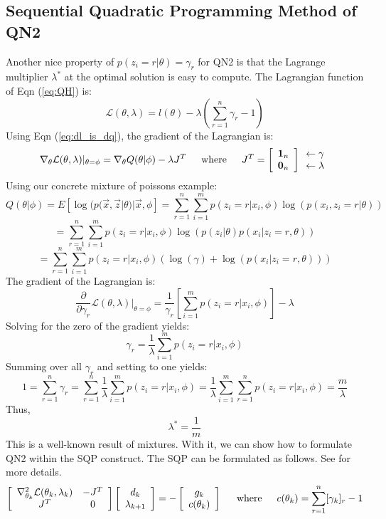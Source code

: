 \documentclass[letter,12pt]{article}
\begin{document}
\subsection{Sequential Quadratic Programming Method of QN2}

Another nice property of $p(z_i=r|\theta)=\gamma_r$ for QN2 is that the Lagrange multiplier $\lambda^*$ at the optimal solution is easy to compute.  The Lagrangian function of Eqn (\ref{eq:QH}) is:
\[
\mathcal{L}(\theta,\lambda) = l(\theta) - \lambda(\sum_{r=1}^{n}\gamma_r - 1)
\]
Using Eqn (\ref{eq:dl_is_dq}), the gradient of the Lagrangian is:
\[
\nabla_{\theta}\mathcal{L}(\theta,\lambda)|_{\theta=\phi}
= \nabla_{\theta}Q(\theta|\phi) - \lambda J^T
\indent
\text{where}
\indent
J^T =
\left[
\begin{array}{c}
\boldsymbol{1}_n
\\
\boldsymbol{0}_n
\end{array}
\right]
\begin{array}{c}
\leftarrow\gamma
\\
\leftarrow\lambda
\end{array}
\]
Using our concrete mixture of poissons example:
\[
Q(\theta|\phi) = E[\log(p(\vec{x},\vec{z}|\theta)|\vec{x},\phi]
=
\sum_{r=1}^{n}\sum_{i=1}^{m}p(z_i=r|x_i,\phi)\log(p(x_i,z_i=r|\theta))
\]
\[
=\sum_{r=1}^{n}\sum_{i=1}^{m}p(z_i=r|x_i,\phi)
\log(p(z_i|\theta)p(x_i|z_i=r,\theta))
\]
\[
=\sum_{r=1}^{n}\sum_{i=1}^{m}p(z_i=r|x_i,\phi)
\left(
\log(\gamma) + \log(p(x_i|z_i=r,\theta))\right)
\]
The gradient of the Lagrangian is:
\[
\frac{\partial}{\partial \gamma_r}\mathcal{L}(\theta,\lambda)|_{\theta=\phi}
=
\frac{1}{\gamma_r}\left[\sum_{i=1}^{m}p(z_i=r|x_i,\phi)
\right]-\lambda
\]
Solving for the zero of the gradient yields:
\[
\gamma_r
=
\frac{1}{\lambda}\sum_{i=1}^{m}p(z_i=r|x_i,\phi)
\]
Summing over all $\gamma_r$ and setting to one yields:
\[
1 = \sum_{r=1}^{n}\gamma_r = 
\sum_{r=1}^{n}\frac{1}{\lambda}\sum_{i=1}^{m}p(z_i=r|x_i,\phi)
=
\frac{1}{\lambda}\sum_{i=1}^{m}\sum_{r=1}^{n}p(z_i=r|x_i,\phi)
= \frac{m}{\lambda}
\]
Thus,
\[
\lambda^* = \frac{1}{m}
\]
This is a well-known result of mixtures.  With it, we can show how to formulate QN2 within the SQP construct. The SQP can be formulated as follows.  See \cite{nocedalwright_SQP} for more details.
\[
\left[
\begin{array}{cc}
\nabla^2_{\theta_k}\mathcal{L}(\theta_k,\lambda_k) & -J^T
\\
J^T & 0
\end{array}
\right]
\left[
\begin{array}{cc}
d_k
\\
\lambda_{k+1}
\end{array}
\right]
=
-
\left[
\begin{array}{c}
g_k
\\
c(\theta_k)
\end{array}
\right]
\indent
\text{where}
\indent
c(\theta_k) = \sum_{r=1}^{n}[\gamma_k]_r - 1
\]
\end{document}
